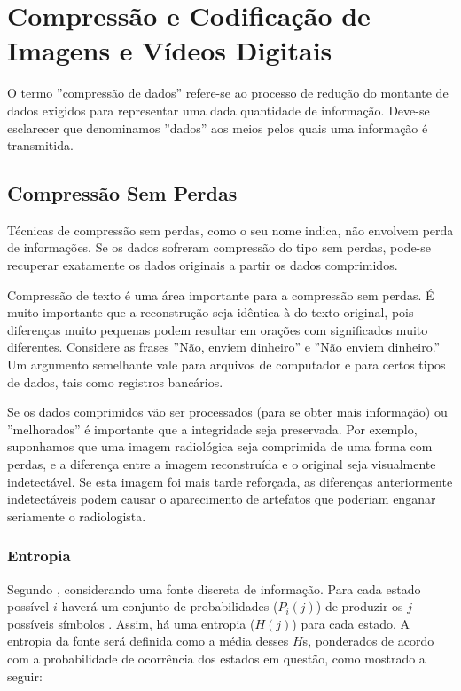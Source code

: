 \section{Compressão e Codificação de Imagens e Vídeos Digitais}

O termo ''compressão de dados'' refere-se ao processo de redução do montante de dados exigidos para representar uma dada quantidade de informação. Deve-se esclarecer que denominamos ''dados'' aos meios pelos quais uma informação é transmitida. \cite{richardson2011h}

\subsection{Compressão Sem Perdas}
Técnicas de compressão sem perdas, como o seu nome indica, não envolvem perda de informações. Se os dados sofreram compressão do tipo sem perdas, pode-se recuperar exatamente os dados originais a partir  os dados comprimidos.\cite{ukrit2011survey}

Compressão de texto é uma área importante para a compressão sem perdas. É muito importante que a reconstrução seja idêntica à do texto original, pois diferenças muito pequenas podem resultar em orações com significados muito diferentes. Considere as frases ''Não, enviem dinheiro'' e ''Não enviem dinheiro.'' Um argumento semelhante vale para arquivos de computador e para certos tipos de dados, tais como registros bancários. \cite{sayood2012introduction}

Se os dados comprimidos vão ser processados (para se obter mais informação) ou ''melhorados'' é importante que a integridade seja preservada. Por exemplo, suponhamos que uma imagem radiológica seja comprimida de uma forma com perdas, e a diferença entre a imagem reconstruída e o original seja visualmente indetectável. Se esta imagem foi mais tarde reforçada, as diferenças anteriormente indetectáveis podem causar o aparecimento de artefatos que poderiam enganar seriamente o radiologista. \cite{sayood2012introduction}
\subsubsection{Entropia}

Segundo \cite{shannon2001mathematical}, considerando uma fonte discreta de informação. Para cada estado possível $i$ haverá um conjunto de probabilidades ($P_i(j)$) de produzir os $j$ possíveis símbolos . Assim, há uma entropia ($H(j)$) para cada estado. A entropia da fonte será definida como a média desses $H$s, ponderados de acordo com a probabilidade de ocorrência dos estados em questão, como mostrado a seguir:

